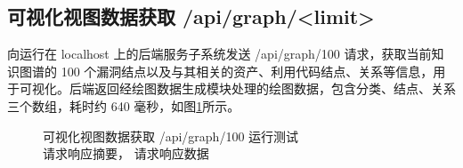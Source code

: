 \documentclass[a4paper,AutoFakeBold,oneside,12pt]{book}
\begin{document}
\subsection{可视化视图数据获取 /api/graph/<limit>}

向运行在 localhost 上的后端服务子系统发送 /api/graph/100 请求，获取当前知识图谱的 100 个漏洞结点以及与其相关的资产、利用代码结点、关系等信息，用于可视化。后端返回经绘图数据生成模块处理的绘图数据，包含分类、结点、关系三个数组，耗时约 640 毫秒，如图\ref{Fig:Backend_api_graph_100}所示。




\begin{figure}[!htbp]
	\centering
	\quad %
	\caption{可视化视图数据获取 /api/graph/100 运行测试\\ \protect{} 请求响应摘要，\protect{} 请求响应数据}
	\label{Fig:Backend_api_graph_100}
\end{figure}
\end{document}
